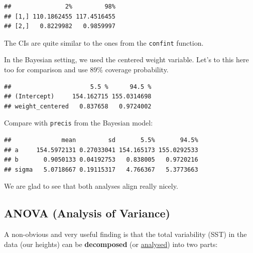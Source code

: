 \documentclass[
]{book}
\newenvironment{Shaded}{\begin{snugshade}}{\end{snugshade}}
\newcommand{\AttributeTok}[1]{\textcolor[rgb]{0.13,0.29,0.53}{#1}}
\newcommand{\CommentTok}[1]{\textcolor[rgb]{0.56,0.35,0.01}{\textit{#1}}}
\newcommand{\FloatTok}[1]{\textcolor[rgb]{0.00,0.00,0.81}{#1}}
\newcommand{\FunctionTok}[1]{\textcolor[rgb]{0.13,0.29,0.53}{\textbf{#1}}}
\newcommand{\NormalTok}[1]{#1}
\newcommand{\OtherTok}[1]{\textcolor[rgb]{0.56,0.35,0.01}{#1}}
\newcommand{\SpecialCharTok}[1]{\textcolor[rgb]{0.81,0.36,0.00}{\textbf{#1}}}
\begin{document}
\begin{verbatim}
##               2%         98%
## [1,] 110.1862455 117.4516455
## [2,]   0.8229982   0.9859997
\end{verbatim}

The CIs are quite similar to the ones from the \texttt{confint} function.

In the Bayesian setting, we used the centered weight variable. Let's to this here too for
comparison and use 89\% coverage probability.

\begin{Shaded}
\end{Shaded}

\begin{verbatim}
##                      5.5 %      94.5 %
## (Intercept)     154.162715 155.0314698
## weight_centered   0.837658   0.9724002
\end{verbatim}

Compare with \texttt{precis} from the Bayesian model:

\begin{verbatim}
##              mean         sd       5.5%       94.5%
## a     154.5972131 0.27033041 154.165173 155.0292533
## b       0.9050133 0.04192753   0.838005   0.9720216
## sigma   5.0718667 0.19115317   4.766367   5.3773663
\end{verbatim}

We are glad to see that both analyses align really nicely.

\subsection{ANOVA (Analysis of Variance)}\label{analysis_of_variance}

A non-obvious and very useful finding is that the total variability (SST)
in the data (our heights) can be
\textbf{decomposed} (or \href{https://en.wiktionary.org/wiki/analysis}{analysed})
into two parts:
\end{document}
